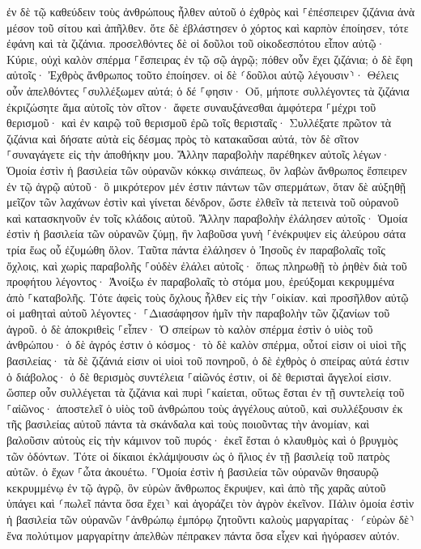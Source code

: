 \documentclass[twoside, 9pt]{extreport}
\begin{document}
ἐν δὲ τῷ καθεύδειν τοὺς ἀνθρώπους ἦλθεν αὐτοῦ ὁ ἐχθρὸς καὶ ⸀ἐπέσπειρεν ζιζάνια ἀνὰ μέσον τοῦ σίτου καὶ ἀπῆλθεν. 
ὅτε δὲ ἐβλάστησεν ὁ χόρτος καὶ καρπὸν ἐποίησεν, τότε ἐφάνη καὶ τὰ ζιζάνια. 
προσελθόντες δὲ οἱ δοῦλοι τοῦ οἰκοδεσπότου εἶπον αὐτῷ· Κύριε, οὐχὶ καλὸν σπέρμα ⸀ἔσπειρας ἐν τῷ σῷ ἀγρῷ; πόθεν οὖν ἔχει ζιζάνια; 
ὁ δὲ ἔφη αὐτοῖς· Ἐχθρὸς ἄνθρωπος τοῦτο ἐποίησεν. οἱ δὲ ⸂δοῦλοι αὐτῷ λέγουσιν⸃· Θέλεις οὖν ἀπελθόντες ⸀συλλέξωμεν αὐτά; 
ὁ δέ ⸀φησιν· Οὔ, μήποτε συλλέγοντες τὰ ζιζάνια ἐκριζώσητε ἅμα αὐτοῖς τὸν σῖτον· 
ἄφετε συναυξάνεσθαι ἀμφότερα ⸀μέχρι τοῦ θερισμοῦ· καὶ ἐν καιρῷ τοῦ θερισμοῦ ἐρῶ τοῖς θερισταῖς· Συλλέξατε πρῶτον τὰ ζιζάνια καὶ δήσατε αὐτὰ εἰς δέσμας πρὸς τὸ κατακαῦσαι αὐτά, τὸν δὲ σῖτον ⸀συναγάγετε εἰς τὴν ἀποθήκην μου. 
Ἄλλην παραβολὴν παρέθηκεν αὐτοῖς λέγων· Ὁμοία ἐστὶν ἡ βασιλεία τῶν οὐρανῶν κόκκῳ σινάπεως, ὃν λαβὼν ἄνθρωπος ἔσπειρεν ἐν τῷ ἀγρῷ αὐτοῦ· 
ὃ μικρότερον μέν ἐστιν πάντων τῶν σπερμάτων, ὅταν δὲ αὐξηθῇ μεῖζον τῶν λαχάνων ἐστὶν καὶ γίνεται δένδρον, ὥστε ἐλθεῖν τὰ πετεινὰ τοῦ οὐρανοῦ καὶ κατασκηνοῦν ἐν τοῖς κλάδοις αὐτοῦ. 
Ἄλλην παραβολὴν ἐλάλησεν αὐτοῖς· Ὁμοία ἐστὶν ἡ βασιλεία τῶν οὐρανῶν ζύμῃ, ἣν λαβοῦσα γυνὴ ⸀ἐνέκρυψεν εἰς ἀλεύρου σάτα τρία ἕως οὗ ἐζυμώθη ὅλον. 
Ταῦτα πάντα ἐλάλησεν ὁ Ἰησοῦς ἐν παραβολαῖς τοῖς ὄχλοις, καὶ χωρὶς παραβολῆς ⸀οὐδὲν ἐλάλει αὐτοῖς· 
ὅπως πληρωθῇ τὸ ῥηθὲν διὰ τοῦ προφήτου λέγοντος· Ἀνοίξω ἐν παραβολαῖς τὸ στόμα μου, ἐρεύξομαι κεκρυμμένα ἀπὸ ⸀καταβολῆς. 
Τότε ἀφεὶς τοὺς ὄχλους ἦλθεν εἰς τὴν ⸀οἰκίαν. καὶ προσῆλθον αὐτῷ οἱ μαθηταὶ αὐτοῦ λέγοντες· ⸀Διασάφησον ἡμῖν τὴν παραβολὴν τῶν ζιζανίων τοῦ ἀγροῦ. 
ὁ δὲ ἀποκριθεὶς ⸀εἶπεν· Ὁ σπείρων τὸ καλὸν σπέρμα ἐστὶν ὁ υἱὸς τοῦ ἀνθρώπου· 
ὁ δὲ ἀγρός ἐστιν ὁ κόσμος· τὸ δὲ καλὸν σπέρμα, οὗτοί εἰσιν οἱ υἱοὶ τῆς βασιλείας· τὰ δὲ ζιζάνιά εἰσιν οἱ υἱοὶ τοῦ πονηροῦ, 
ὁ δὲ ἐχθρὸς ὁ σπείρας αὐτά ἐστιν ὁ διάβολος· ὁ δὲ θερισμὸς συντέλεια ⸀αἰῶνός ἐστιν, οἱ δὲ θερισταὶ ἄγγελοί εἰσιν. 
ὥσπερ οὖν συλλέγεται τὰ ζιζάνια καὶ πυρὶ ⸀καίεται, οὕτως ἔσται ἐν τῇ συντελείᾳ τοῦ ⸀αἰῶνος· 
ἀποστελεῖ ὁ υἱὸς τοῦ ἀνθρώπου τοὺς ἀγγέλους αὐτοῦ, καὶ συλλέξουσιν ἐκ τῆς βασιλείας αὐτοῦ πάντα τὰ σκάνδαλα καὶ τοὺς ποιοῦντας τὴν ἀνομίαν, 
καὶ βαλοῦσιν αὐτοὺς εἰς τὴν κάμινον τοῦ πυρός· ἐκεῖ ἔσται ὁ κλαυθμὸς καὶ ὁ βρυγμὸς τῶν ὀδόντων. 
Τότε οἱ δίκαιοι ἐκλάμψουσιν ὡς ὁ ἥλιος ἐν τῇ βασιλείᾳ τοῦ πατρὸς αὐτῶν. ὁ ἔχων ⸀ὦτα ἀκουέτω. 
⸀Ὁμοία ἐστὶν ἡ βασιλεία τῶν οὐρανῶν θησαυρῷ κεκρυμμένῳ ἐν τῷ ἀγρῷ, ὃν εὑρὼν ἄνθρωπος ἔκρυψεν, καὶ ἀπὸ τῆς χαρᾶς αὐτοῦ ὑπάγει καὶ ⸂πωλεῖ πάντα ὅσα ἔχει⸃ καὶ ἀγοράζει τὸν ἀγρὸν ἐκεῖνον. 
Πάλιν ὁμοία ἐστὶν ἡ βασιλεία τῶν οὐρανῶν ⸀ἀνθρώπῳ ἐμπόρῳ ζητοῦντι καλοὺς μαργαρίτας· 
⸂εὑρὼν δὲ⸃ ἕνα πολύτιμον μαργαρίτην ἀπελθὼν πέπρακεν πάντα ὅσα εἶχεν καὶ ἠγόρασεν αὐτόν. 
\end{document}
